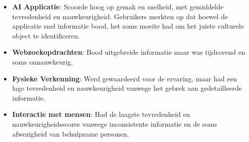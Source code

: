 \begin{itemize}
    \item \textbf{AI Applicatie}: Scoorde hoog op gemak en snelheid, met gemiddelde tevredenheid en nauwkeurigheid. Gebruikers merkten op dat hoewel de applicatie snel informatie bood, het soms moeite had om het juiste culturele object te identificeren.
    \item \textbf{Webzoekopdrachten}: Bood uitgebreide informatie maar was tijdrovend en soms onnauwkeurig.
    \item \textbf{Fysieke Verkenning}: Werd gewaardeerd voor de ervaring, maar had een lage tevredenheid en nauwkeurigheid vanwege het gebrek aan gedetailleerde informatie.
    \item \textbf{Interactie met mensen}: Had de laagste tevredenheid en nauwkeurigheidsscores vanwege inconsistente informatie en de soms afwezigheid van behulpzame personen.
\end{itemize}
